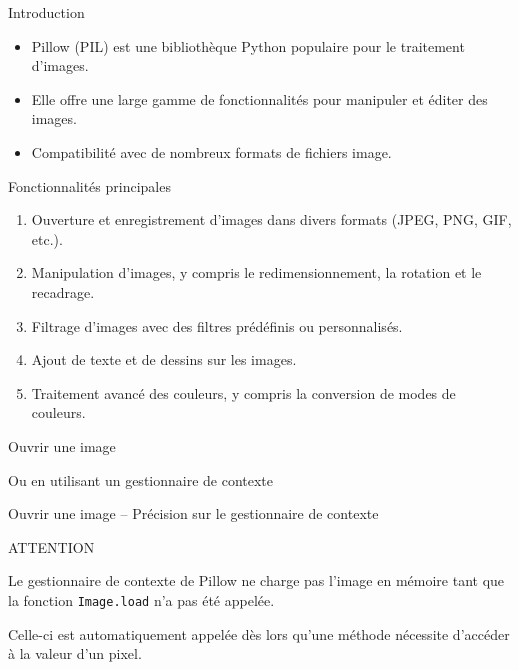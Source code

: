 \begin{frame}{Introduction}
    \begin{itemize}
        \item \alert{Pillow} (PIL) est une bibliothèque Python populaire pour le traitement d'images.
        \item Elle offre une large gamme de fonctionnalités pour manipuler et éditer des images.
        \item Compatibilité avec de nombreux formats de fichiers image.
    \end{itemize}
\end{frame}

\begin{frame}{Fonctionnalités principales}
    \begin{enumerate}
        \item Ouverture et enregistrement d'images dans divers formats (JPEG, PNG, GIF, etc.).
        \item Manipulation d'images, y compris le redimensionnement, la rotation et le recadrage.
        \item Filtrage d'images avec des filtres prédéfinis ou personnalisés.
        \item Ajout de texte et de dessins sur les images.
        \item Traitement avancé des couleurs, y compris la conversion de modes de couleurs.
    \end{enumerate}
\end{frame}

\begin{frame}{Ouvrir une image}


    Ou en utilisant un gestionnaire de contexte

    
\end{frame}

\begin{frame}{Ouvrir une image -- Précision sur le gestionnaire de contexte}
    \begin{center}
        \alert{ATTENTION}
    \end{center}
    
    Le gestionnaire de contexte de Pillow ne charge pas l'image en mémoire tant que la fonction \texttt{Image.load} n'a pas été appelée. 
    
    Celle-ci est automatiquement appelée dès lors qu'une méthode nécessite d'accéder à la valeur d'un pixel.
    
\end{frame}

